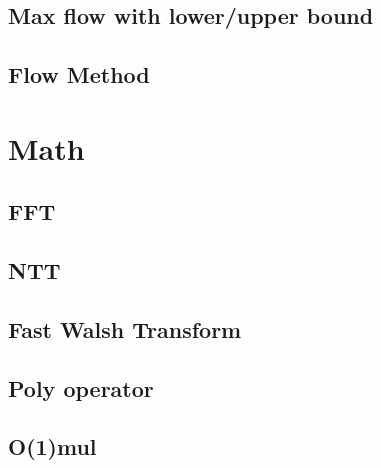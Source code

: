 \documentclass[a4paper,10pt,twocolumn,oneside]{article}
\begin{document}
%

\subsection{Max flow with lower/upper bound}


% 

% 

\subsection{Flow Method}


\section{Math}
\subsection{FFT}


\subsection{NTT}


\subsection{Fast Walsh Transform}


\subsection{Poly operator}


\subsection{O(1)mul}

\end{document}
